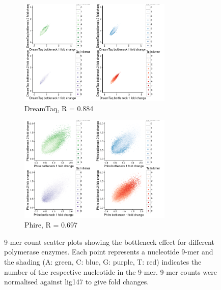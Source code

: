 \documentclass[a4paper, numbers=noenddot]{scrbook}
\begin{document}
\begin{figure}[htbp]
  \centering
  \begin{subfigure}[htbp]{0.8\textwidth}
    \centering
    \includegraphics[width=0.8\textwidth]{kmer_dreamtaqBN}
    \caption{DreamTaq, R = 0.884}
    \label{fig:kmer_bn_dreamtaq}
  \end{subfigure}
  \begin{subfigure}[htbp]{0.8\textwidth}
    \centering
    \includegraphics[width=0.8\textwidth]{kmer_phireBN}
    \caption{Phire, R = 0.697}
    \label{fig:kmer_bn_phire}
  \end{subfigure}
    \caption{9-mer count scatter plots showing the bottleneck effect for different polymerase enzymes.  Each point represents a nucleotide 9-mer and the shading (A: green, C: blue, G: purple, T: red) indicates the number of the respective nucleotide in the 9-mer.  9-mer counts were normalised against lig147 to give fold changes.}
\label{fig:kmer_bn}
\end{figure}
\end{document}
